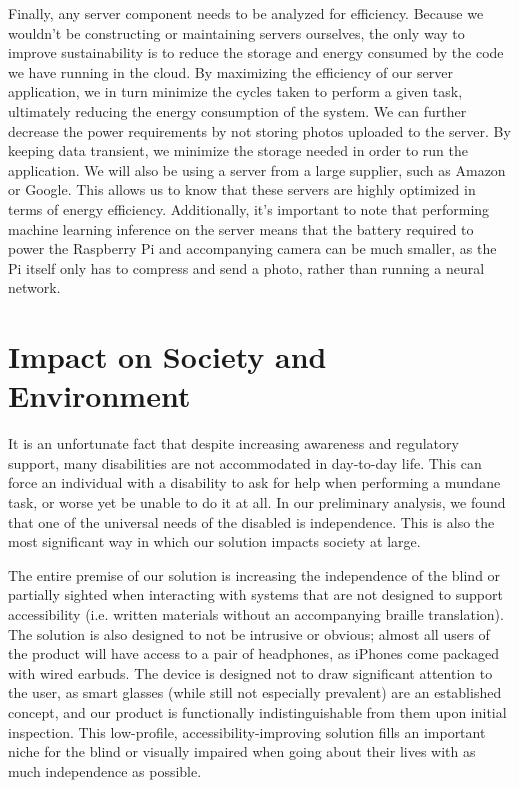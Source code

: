 \documentclass[a4paper,11pt]{article}
\begin{document}
Finally, any server component needs to be analyzed for efficiency. Because we wouldn't be constructing or maintaining servers ourselves, the only way to improve sustainability is to reduce the storage and energy consumed by the code we have running in the cloud. By maximizing the efficiency of our server application, we in turn minimize the cycles taken to perform a given task, ultimately reducing the energy consumption of the system. We can further decrease the power requirements by not storing photos uploaded to the server. By keeping data transient, we minimize the storage needed in order to run the application. We will also be using a server from a large supplier, such as Amazon or Google. This allows us to know that these servers are highly optimized in terms of energy efficiency. Additionally, it's important to note that performing machine learning inference on the server means that the battery required to power the Raspberry Pi and accompanying camera can be much smaller, as the Pi itself only has to compress and send a photo, rather than running a neural network.

\section{Impact on Society and Environment}
It is an unfortunate fact that despite increasing awareness and regulatory support, many disabilities are not accommodated in day-to-day life. This can force an individual with a disability to ask for help when performing a mundane task, or worse yet be unable to do it at all. In our preliminary analysis, we found that one of the universal needs of the disabled is independence. This is also the most significant way in which our solution impacts society at large.

The entire premise of our solution is increasing the independence of the blind or partially sighted when interacting with systems that are not designed to support accessibility (i.e. written materials without an accompanying braille translation). The solution is also designed to not be intrusive or obvious; almost all users of the product will have access to a pair of headphones, as iPhones come packaged with wired earbuds. The device is designed not to draw significant attention to the user, as smart glasses (while still not especially prevalent) are an established concept, and our product is functionally indistinguishable from them upon initial inspection. This low-profile, accessibility-improving solution fills an important niche for the blind or visually impaired when going about their lives with as much independence as possible.
\end{document}
